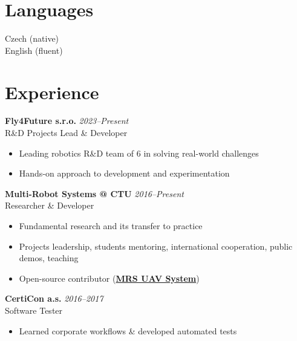 \documentclass[12pt,a4paper]{article}
\newcommand\Colorhreff[3][reff]{\href{#2}{\color{#1}#3}}
\begin{document}
\begin{paracol}{2}
\vspace{0.6em}
\section*{Languages}
Czech (native)\\
English (fluent)

\switchcolumn

\color{primary}

\vspace{-0.5cm}
\section*{Experience}

\textbf{Fly4Future s.r.o.} \hfill \textit{2023–Present} \\
R\&D Projects Lead \& Developer
\begin{itemize}
  \item Leading robotics R\&D team of 6 in solving real-world challenges
  \item Hands-on approach to development and experimentation
\end{itemize}

\vspace{0.5cm}
\noindent
\textbf{Multi-Robot Systems @ CTU} \hfill \textit{2016–Present} \\
Researcher \& Developer
\begin{itemize}
  \item Fundamental research and its transfer to practice
  \item Projects leadership, students mentoring, international cooperation, public demos, teaching
  \item Open-source contributor (\Colorhreff{https://github.com/ctu-mrs/mrs_uav_system}{\textbf{MRS UAV System}})
\end{itemize}

\vspace{0.5cm}
\noindent
\textbf{CertiCon a.s.} \hfill \textit{2016–2017} \\
Software Tester
\begin{itemize}
  \item Learned corporate workflows \& developed automated tests
\end{itemize}


\end{paracol}
\end{document}
